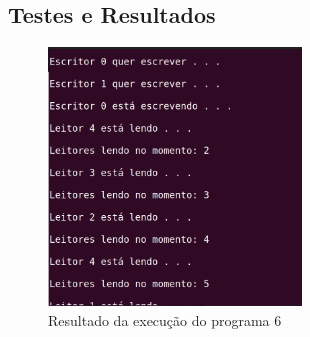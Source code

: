 \documentclass{article}
\begin{document}
\subsection{Testes e Resultados}
\begin{figure}[ht]
    \centering
    \includegraphics[width=0.6\textwidth]{./Images/atv6_result.png}
    \caption{Resultado da execução do programa 6}
    \label{fig:atv5}
\end{figure}
\end{document}
